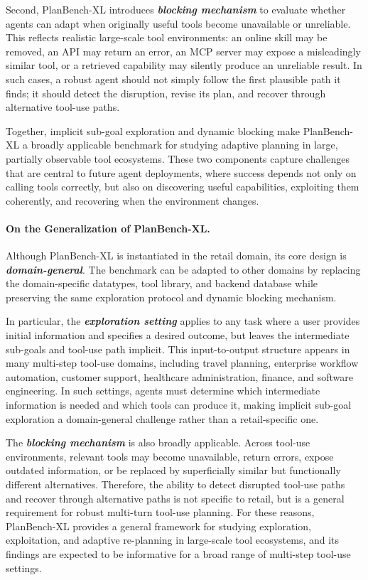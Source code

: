 \documentclass{llmxive}
\providecommand{\bench}[1]{PlanBench-XL}
\begin{document}
Second, \bench{} introduces \textit{\textbf{blocking mechanism}} to evaluate whether agents can adapt when originally useful tools become unavailable or unreliable. 
This reflects realistic large-scale tool environments: an online skill may be removed, an API may return an error, an MCP server may expose a misleadingly similar tool, or a retrieved capability may silently produce an unreliable result. 
In such cases, a robust agent should not simply follow the first plausible path it finds; it should detect the disruption, revise its plan, and recover through alternative tool-use paths.

Together, implicit sub-goal exploration and dynamic blocking make \bench{} a broadly applicable benchmark for studying adaptive planning in large, partially observable tool ecosystems. 
These two components capture challenges that are central to future agent deployments, where success depends not only on calling tools correctly, but also on discovering useful capabilities, exploiting them coherently, and recovering when the environment changes.

\paragraph{On the Generalization of \bench{}.}

Although \bench{} is instantiated in the retail domain, its core design is \textit{\textbf{domain-general}}. 
The benchmark can be adapted to other domains by replacing the domain-specific datatypes, tool library, and backend database while preserving the same exploration protocol and dynamic blocking mechanism. 

In particular, the \textit{\textbf{exploration setting}} applies to any task where a user provides initial information and specifies a desired outcome, but leaves the intermediate sub-goals and tool-use path implicit. 
This input-to-output structure appears in many multi-step tool-use domains, including travel planning, enterprise workflow automation, customer support, healthcare administration, finance, and software engineering. 
In such settings, agents must determine which intermediate information is needed and which tools can produce it, making implicit sub-goal exploration a domain-general challenge rather than a retail-specific one.

The \textit{\textbf{blocking mechanism}} is also broadly applicable. 
Across tool-use environments, relevant tools may become unavailable, return errors, expose outdated information, or be replaced by superficially similar but functionally different alternatives. 
Therefore, the ability to detect disrupted tool-use paths and recover through alternative paths is not specific to retail, but is a general requirement for robust multi-turn tool-use planning. 
For these reasons, \bench{} provides a general framework for studying exploration, exploitation, and adaptive re-planning in large-scale tool ecosystems, and its findings are expected to be informative for a broad range of multi-step tool-use settings.
\end{document}
